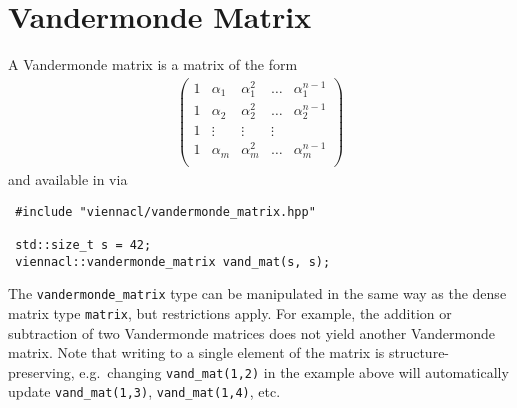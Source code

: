 \section{Vandermonde Matrix}
A Vandermonde matrix is a matrix of the form
\begin{align*}
 \left( \begin{array}{ccccc}
         1 & \alpha_1 & \alpha_1^2 & \ldots & \alpha_1^{n-1} \\
         1 & \alpha_2 & \alpha_2^2 & \ldots & \alpha_2^{n-1} \\
         1 & \vdots & \vdots & \vdots \\
         1 & \alpha_m & \alpha_m^2 & \ldots & \alpha_m^{n-1} \\
        \end{array} \right)
\end{align*}
and available in {\ViennaCL} via
\begin{lstlisting}
 #include "viennacl/vandermonde_matrix.hpp"

 std::size_t s = 42;
 viennacl::vandermonde_matrix vand_mat(s, s);
\end{lstlisting}
The \lstinline|vandermonde_matrix| type can be manipulated in the same way as the dense matrix type \lstinline|matrix|, but restrictions apply. For
example, the addition or subtraction of two Vandermonde matrices does not yield another Vandermonde matrix. Note that writing to a single element of
the matrix is structure-preserving, e.g.~changing \lstinline|vand_mat(1,2)| in the example above will automatically update \lstinline|vand_mat(1,3)|,
\lstinline|vand_mat(1,4)|, etc.

